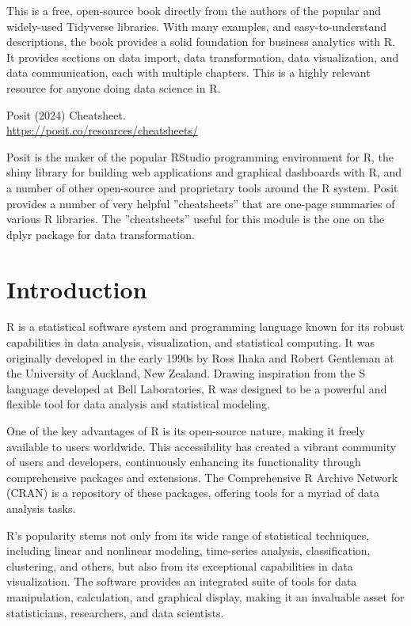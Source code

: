 This is a free, open-source book directly from the authors of the popular and widely-used Tidyverse libraries. With many examples, and easy-to-understand descriptions, the book provides a solid foundation for business analytics with R. It provides sections on data import, data transformation, data visualization, and data communication, each with multiple chapters. This is a highly relevant resource for anyone doing data science in R.

\begin{resourcebox}
Posit (2024) Cheatsheet. \\

\footnotesize\url{https://posit.co/resources/cheatsheets/}\normalsize
\end{resourcebox}

Posit is the maker of the popular RStudio programming environment for R, the shiny library for building web applications and graphical dashboards with R, and a number of other open-source and proprietary tools around the R system. Posit provides a number of very helpful ''cheatsheets'' that are one-page summaries of various R libraries. The ''cheatsheets'' useful for this module is the one on the dplyr package for data transformation.


\section{Introduction}

R is a statistical software system and programming language known for its robust capabilities in data analysis, visualization, and statistical computing. It was originally developed in the early 1990s by Ross Ihaka and Robert Gentleman at the University of Auckland, New Zealand. Drawing inspiration from the S language developed at Bell Laboratories, R was designed to be a powerful and flexible tool for data analysis and statistical modeling.

One of the key advantages of R is its open-source nature, making it freely available to users worldwide. This accessibility has created a vibrant community of users and developers, continuously enhancing its functionality through comprehensive packages and extensions. The Comprehensive R Archive Network (CRAN) is a repository of these packages, offering tools for a myriad of data analysis tasks.

R's popularity stems not only from its wide range of statistical techniques, including linear and nonlinear modeling, time-series analysis, classification, clustering, and others, but also from its exceptional capabilities in data visualization. The software provides an integrated suite of tools for data manipulation, calculation, and graphical display, making it an invaluable asset for statisticians, researchers, and data scientists.

